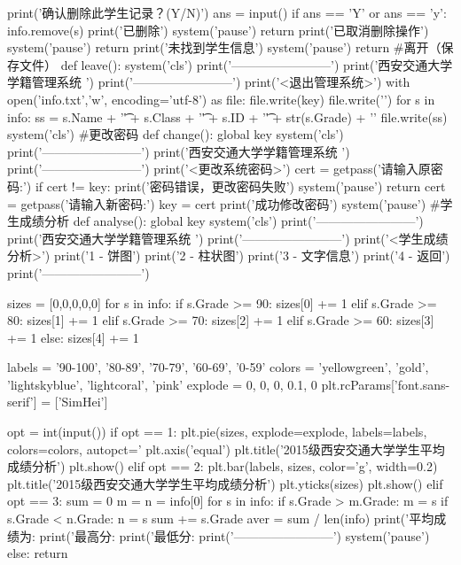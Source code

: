\documentclass{article}
\begin{document}
\begin{python}
            print('确认删除此学生记录？(Y/N)')
            ans = input()
            if ans == 'Y' or ans == 'y':
                info.remove(s)
                print('已删除')
                system('pause')
                return
            print('已取消删除操作')
            system('pause')
            return
    print('未找到学生信息')
    system('pause')
    return
#离开（保存文件）
def leave():
    system('cls')
    print('------------------------')
    print('西安交通大学学籍管理系统     ')
    print('------------------------')
    print('<退出管理系统>')
    with open('info.txt','w', encoding='utf-8') as file:
        file.write(key)
        file.write('\n')
        for s in info:
            ss = s.Name + '\t' + s.Class + '\t' + s.ID + '\t' + str(s.Grade) + '\n'
            file.write(ss)
    system('cls')
#更改密码
def change():
    global key
    system('cls')
    print('------------------------')
    print('西安交通大学学籍管理系统     ')
    print('------------------------')
    print('<更改系统密码>')
    cert = getpass('请输入原密码:')
    if cert != key:
        print('密码错误，更改密码失败')
        system('pause')
        return
    cert = getpass('请输入新密码:')
    key = cert
    print('成功修改密码')
    system('pause')
#学生成绩分析
def analyse():
    global key
    system('cls')
    print('------------------------')
    print('西安交通大学学籍管理系统     ')
    print('------------------------')
    print('<学生成绩分析>')
    print('1 - 饼图')
    print('2 - 柱状图')
    print('3 - 文字信息')
    print('4 - 返回')
    print('------------------------')

    sizes = [0,0,0,0,0]
    for s in info:
        if s.Grade >= 90:
            sizes[0] += 1
        elif s.Grade >= 80:
            sizes[1] += 1
        elif s.Grade >= 70:
            sizes[2] += 1
        elif s.Grade >= 60:
            sizes[3] += 1
        else:
            sizes[4] += 1

    labels = '90-100', '80-89', '70-79', '60-69', '0-59'
    colors = 'yellowgreen', 'gold', 'lightskyblue', 'lightcoral', 'pink'
    explode = 0, 0, 0, 0.1, 0
    plt.rcParams['font.sans-serif'] = ['SimHei']

    opt = int(input())
    if opt == 1:
        plt.pie(sizes, explode=explode, labels=labels, colors=colors, autopct='%
        plt.axis('equal')
        plt.title('2015级西安交通大学学生平均成绩分析\n')
        plt.show()
    elif opt == 2:
        plt.bar(labels, sizes, color='g', width=0.2)
        plt.title('2015级西安交通大学学生平均成绩分析')
        plt.yticks(sizes)
        plt.show()
    elif opt == 3:
        sum = 0
        m = n = info[0]
        for s in info:
            if s.Grade > m.Grade:
                m = s
            if s.Grade < n.Grade:
                n = s
            sum += s.Grade
        aver = sum / len(info)
        print('平均成绩为:%
        print('最高分:%
        print('最低分:%
        print('------------------------')
        system('pause')
    else:
        return


\end{python}
\end{document}
